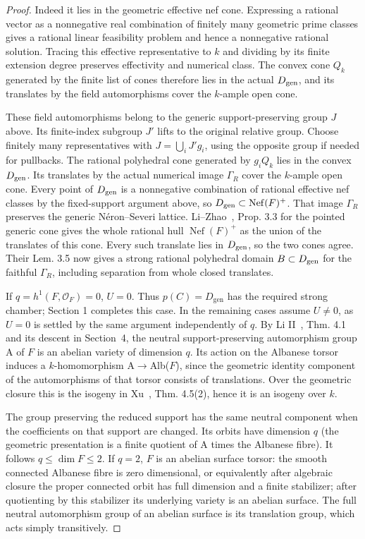 \documentclass[11pt]{article}
\begin{document}
\begin{proof}
Indeed it lies in the geometric effective nef cone. Expressing a rational vector as a nonnegative real
combination of finitely many geometric prime classes gives a rational linear feasibility problem and
hence a nonnegative rational solution. Tracing this effective representative to \(k\) and dividing by its
finite extension degree preserves effectivity and numerical class. The convex cone \(Q_k\) generated by
the finite list of cones therefore lies in the actual \(D_{\rm gen}\), and its translates by the field
automorphisms cover the \(k\)-ample open cone.

These field automorphisms belong to the generic support-preserving group \(J\) above. Its finite-index
subgroup \(J'\) lifts to the original relative group. Choose finitely many representatives with
\(J=\bigcup_i J'g_i\), using the opposite group if needed for pullbacks. The rational polyhedral cone
generated by \(g_iQ_k\) lies in the convex \(D_{\rm gen}\). Its translates by the actual numerical image
\(\Gamma_R\) cover the \(k\)-ample open cone. Every point of \(D_{\rm gen}\) is a nonnegative combination
of rational effective nef classes by the fixed-support argument above, so \(D_{\rm
gen}\subset\operatorname{Nef}(F)^+\). That image \(\Gamma_R\) preserves the generic Néron--Severi
lattice. Li--Zhao~\cite{LiZhao}, Prop. 3.3 for the pointed generic cone gives the whole rational hull
\(\operatorname{Nef}(F)^+\) as the union of the translates of this cone. Every such translate lies in
\(D_{\rm gen}\), so the two cones agree. Their Lem. 3.5 now gives a strong rational polyhedral domain
\(B\subset D_{\rm gen}\) for the faithful \(\Gamma_R\), including separation from whole closed
translates.

If \(q=h^1(F,\mathcal O_F)=0\), \(U=0\). Thus \(p(C)=D_{\mathrm{gen}}\) has the required strong
chamber; Section 1 completes this case. In the remaining cases assume \(U\ne0\), as \(U=0\) is settled by
the same argument independently of \(q\). By Li II~\cite{LiII}, Thm. 4.1 and its descent in Section~4,
the neutral support-preserving automorphism group A of \(F\) is an abelian variety of dimension \(q\).
Its action on the Albanese torsor induces a \(k\)-homomorphism A\(\to\)Alb(\(F\)), since the geometric
identity component of the automorphisms of that torsor consists of translations. Over the geometric
closure this is the isogeny in Xu~\cite{Xu}, Thm. 4.5(2), hence it is an isogeny over \(k\).

The group preserving the reduced support has the same neutral component when the coefficients on that
support are changed. Its orbits have dimension \(q\) (the geometric presentation is a finite quotient of
A times the Albanese fibre). It follows \(q\le\dim F\le2\). If \(q=2\), \(F\) is an abelian surface
torsor: the smooth connected Albanese fibre is zero dimensional, or equivalently after algebraic closure
the proper connected orbit has full dimension and a finite stabilizer; after quotienting by this
stabilizer its underlying variety is an abelian surface. The full neutral automorphism group of an
abelian surface is its translation group, which acts simply transitively.


\end{proof}
\end{document}
